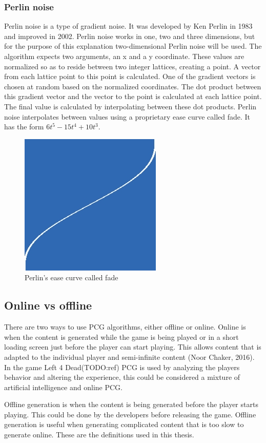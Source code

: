 		\subsubsection{Perlin noise}
		Perlin noise is a type of gradient noise. It was developed by Ken Perlin in 1983 and improved in 2002\cite{PerlinNoise}. Perlin noise works in one, two and three dimensions, but for the purpose of this explanation two-dimensional Perlin noise will be used. The algorithm expects two arguments, an x and a y coordinate. These values are normalized so as to reside between two integer lattices, creating a point. A vector from each lattice point to this point is calculated. One of the gradient vectors is chosen at random based on the normalized coordinates. The dot product between this gradient vector and the vector to the point is calculated at each lattice point. The final value is calculated by interpolating between these dot products. Perlin noise interpolates between values using a proprietary ease curve called fade. It has the form \begin{math}6t^5-15t^4+10t^3\end{math}.
		\begin{figure}[h]
			\centering
			\includegraphics[width=0.35\linewidth]{"images/fade"}
			\caption{Perlin's ease curve called fade}
			\label{fig:fade}
		\end{figure}
	
	\subsection{Online vs offline}
	There are two ways to use PCG algorithms, either offline or online. Online is when the content is generated while the game is being played or in a short loading screen just before the player can start playing. This allows content that is adapted to the individual player and semi-infinite content (Noor Chaker, 2016). In the game Left 4 Dead(TODO:ref) PCG is used by analyzing the players behavior and altering the experience, this could be considered a mixture of artificial intelligence and online PCG.
	\par Offline generation is when the content is being generated before the player starts playing. This could be done by the developers before releasing the game. Offline generation is useful when generating complicated content that is too slow to generate online.
	These are the definitions used in this thesis.
	
